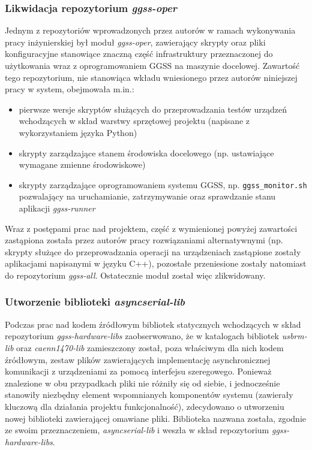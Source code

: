 \subsubsection{Likwidacja repozytorium \emph{ggss-oper}}
Jednym z repozytoriów wprowadzonych przez autorów w ramach wykonywania pracy inżynierskiej był moduł \emph{ggss-oper}, zawierający skrypty oraz pliki konfiguracyjne stanowiące znaczną część infrastruktury przeznaczonej do użytkowania wraz z oprogramowaniem GGSS na maszynie docelowej. Zawartość tego repozytorium, nie stanowiąca wkładu wniesionego przez autorów niniejszej pracy w system, obejmowała m.in.: 
\begin{itemize}
    \item pierwsze wersje skryptów służących do przeprowadzania testów urządzeń wchodzących w skład warstwy sprzętowej projektu (napisane z wykorzystaniem języka Python)
    \item skrypty zarządzające stanem środowiska docelowego (np. ustawiające wymagane zmienne środowiskowe)
    \item skrypty zarządzające oprogramowaniem systemu GGSS, np. \lstinline{ggss_monitor.sh} pozwalający na uruchamianie, zatrzymywanie oraz sprawdzanie stanu aplikacji \emph{ggss-runner}
\end{itemize}
Wraz z postępami prac nad projektem, część z wymienionej powyżej zawartości zastąpiona została przez autorów pracy rozwiązaniami alternatywnymi (np. skrypty służące do przeprowadzania operacji na urządzeniach zastąpione zostały aplikacjami napisanymi w języku C++), pozostałe przeniesione zostały natomiast do repozytorium \emph{ggss-all}. Ostatecznie moduł został więc zlikwidowany.


\subsubsection{Utworzenie biblioteki \emph{asyncserial-lib}}
Podczas prac nad kodem źródłowym bibliotek statycznych wchodzących w skład repozytorium \emph{ggss-hardware-libs} zaobserwowano, że w katalogach bibliotek \emph{usbrm-lib} oraz \emph{caenn1470-lib} zamieszczony został, poza właściwym dla nich kodem źródłowym, zestaw plików zawierających implementację asynchronicznej komunikacji z urządzeniami za pomocą interfejsu szeregowego. Ponieważ znalezione w obu przypadkach pliki nie różniły się od siebie, i jednocześnie stanowiły niezbędny element wspomnianych komponentów systemu (zawierały kluczową dla działania projektu funkcjonalność), zdecydowano o utworzeniu nowej biblioteki zawierającej omawiane pliki. Biblioteka nazwana została, zgodnie ze swoim przeznaczeniem, \emph{asyncserial-lib} i weszła w skład repozytorium \emph{ggss-hardware-libs}.


